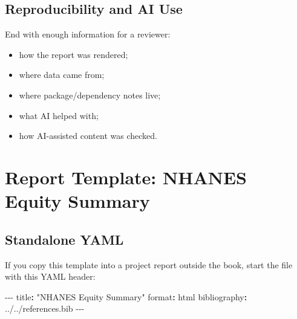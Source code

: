 \documentclass[
  letterpaper,
  DIV=11,
  numbers=noendperiod,
  oneside]{scrreprt}
\newenvironment{Shaded}{\begin{snugshade}}{\end{snugshade}}
\newcommand{\AttributeTok}[1]{\textcolor[rgb]{0.40,0.45,0.13}{#1}}
\newcommand{\FunctionTok}[1]{\textcolor[rgb]{0.28,0.35,0.67}{#1}}
\newcommand{\KeywordTok}[1]{\textcolor[rgb]{0.00,0.23,0.31}{\textbf{#1}}}
\newcommand{\PreprocessorTok}[1]{\textcolor[rgb]{0.68,0.00,0.00}{#1}}
\newcommand{\StringTok}[1]{\textcolor[rgb]{0.13,0.47,0.30}{#1}}
\providecommand{\tightlist}{%
  \setlength{\itemsep}{0pt}\setlength{\parskip}{0pt}}
\begin{document}
\section*{Reproducibility and AI Use}\label{reproducibility-and-ai-use}


End with enough information for a reviewer:

\begin{itemize}
\tightlist
\item
  how the report was rendered;
\item
  where data came from;
\item
  where package/dependency notes live;
\item
  what AI helped with;
\item
  how AI-assisted content was checked.
\end{itemize}

\chapter*{Report Template: NHANES Equity
Summary}\label{report-template-nhanes-equity-summary}


\section*{Standalone YAML}\label{standalone-yaml}


If you copy this template into a project report outside the book, start
the file with this YAML header:

\begin{Shaded}
\begin{Highlighting}[numbers=left,,]
\PreprocessorTok{{-}{-}{-}}
\FunctionTok{title}\KeywordTok{:}\AttributeTok{ }\StringTok{"NHANES Equity Summary"}
\FunctionTok{format}\KeywordTok{:}\AttributeTok{ html}
\FunctionTok{bibliography}\KeywordTok{:}\AttributeTok{ ../../references.bib}
\PreprocessorTok{{-}{-}{-}}
\end{Highlighting}
\end{Shaded}
\end{document}
